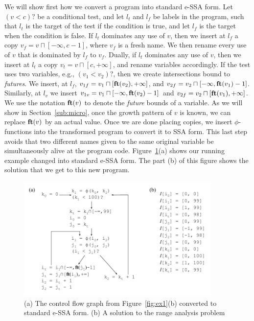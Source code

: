 \documentclass{llncs}
\newcommand{\fun}[1]{\mbox{\textbf{#1}}}
\begin{document}
We will show first how we convert a program into standard e-SSA form.
Let $(v < c)?$ be a conditional test, and let $l_t$ and $l_f$ be labels in
the program, such that $l_t$ is the target of the test if the condition is true,
and let $l_f$ is the target when the condition is false.
If $l_t$ dominates any use of $v$, then we insert at $l_f$ a copy
$v_f = v \sqcap [-\infty, c-1]$, where $v_f$ is a fresh name.
We then rename every use of $v$ that is dominated by $l_f$ to $v_f$.
Dually, if $l_t$ dominates any use of $v$, then we insert at $l_t$ a copy
$v_t = v \sqcap [c, +\infty]$, and rename variables accordingly.
If the test uses two variables, e.g., $(v_1 < v_2)?$, then we create
intersections bound to {\em futures}.
We insert, at $l_f$, $v_{1f} = v_1 \sqcap [\fun{ft}(v_2), +\infty]$,
and $v_{2f} = v_2 \sqcap [-\infty, \fun{ft}(v_1) - 1]$.
Similarly, at $l_v$ we insert
$v_{1v} = v_1 \sqcap [-\infty, \fun{ft}(v_2) - 1]$
and $v_{2f} = v_2 \sqcap [\fun{ft}(v_1), +\infty]$.
We use the notation $\fun{ft}(v)$ to denote the {\em future} bounds of a
variable.
As we will show in Section~\ref{sub:micro}, once the growth pattern of $v$ is
known, we can replace $\fun{ft}(v)$ by an actual value.
Once we are done placing copies, we insert $\phi$-functions into the
transformed program to convert it to SSA form.
This last step avoids that two different names given to the same original
variable be simultaneously alive at the program code.
Figure~\ref{fig:ex_standard_eSSA}(a) shows our running example changed into
standard e-SSA form.
The part (b) of this figure shows the solution that we get to this new
program.

\begin{figure}[t!]
\begin{center}
\includegraphics[width=0.9\textwidth]{images/ex_standard_eSSA}
\end{center}
\caption{\label{fig:ex_standard_eSSA}
(a) The control flow graph from Figure~\ref{fig:ex1}(b) converted to standard
e-SSA form.
(b) A solution to the range analysis problem
}
\end{figure}
\end{document}
